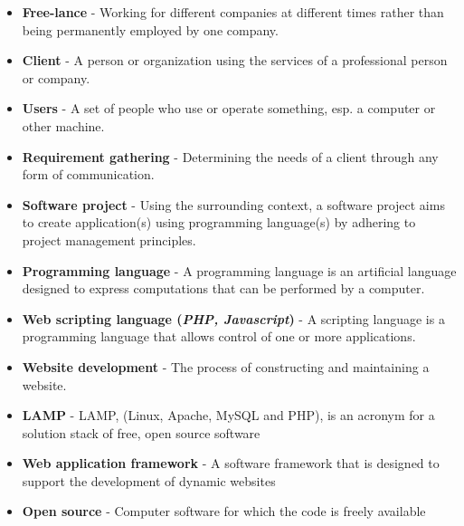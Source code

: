 \documentclass{l3proj}
\begin{document}
\begin{itemize}
\item{\textbf{Free-lance} - Working for different companies at different times rather than being permanently employed by one company.} 
\item{\textbf{Client} - A person or organization using the services of a professional person or company.} 
\item{\textbf{Users} - A set of people who use or operate something, esp. a computer or other machine.}
\item{\textbf{Requirement gathering} - Determining the needs of a client through any form of communication.}
\item{\textbf{Software project} - Using the surrounding context, a software project aims to create application(s) using programming language(s) by adhering to project management principles.}
\item{\textbf{Programming language} - A programming language is an artificial language designed to express computations that can be performed by a computer.}
\item{\textbf{Web scripting language (\textit{PHP, Javascript})} - A scripting language is a programming language that allows control of one or more applications.}
\item{\textbf{Website development} - The process of constructing and maintaining a website.}
\item{\textbf{LAMP} - LAMP, (Linux, Apache, MySQL and PHP), is an acronym for a solution stack of free, open source software}
\item{\textbf{Web application framework} - A software framework that is designed to support the development of dynamic websites }
\item{\textbf{Open source} - Computer software for which the code is freely available }
\end{itemize}


\end{document}

